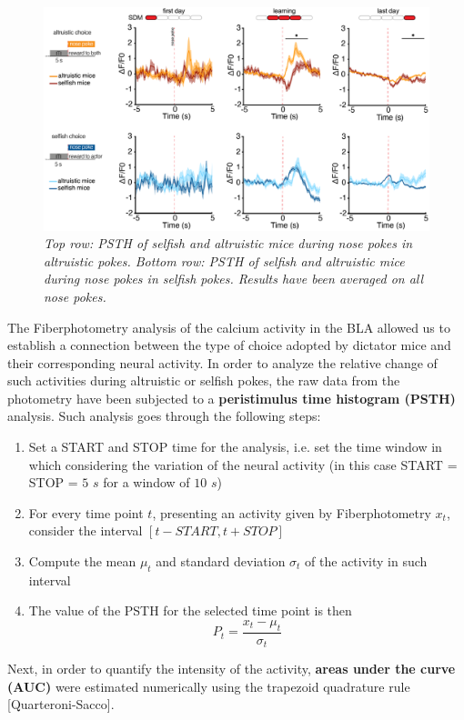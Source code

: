 \documentclass[12pt, a4paper]{report}
\begin{document}
\begin{figure}[H]
	\begin{center}
		\includegraphics[scale=0.55]{psth.png} 
	\end{center} 
	\caption{\textit{Top row: PSTH of selfish and altruistic mice during nose pokes in altruistic pokes. Bottom row:  PSTH of selfish and altruistic mice during nose pokes in selfish pokes. Results have been averaged on all nose pokes.}}
	\label{psth}
\end{figure}

The Fiberphotometry analysis of the calcium activity in the BLA allowed us to establish a connection between the type of choice adopted by dictator mice and their corresponding neural activity. In order to analyze the relative change of such activities during altruistic or selfish pokes, the raw data from the photometry have been subjected to a \textbf{peristimulus time histogram (PSTH)} analysis. Such analysis goes through the following steps:

\begin{enumerate}
	
	\item Set a START and STOP time for the analysis, i.e. set the time window in which considering the variation of the neural activity (in this case START = STOP = $5$ $s$ for a window of $10$ $s$)
	
	\item For every time point $t$, presenting an activity given by Fiberphotometry $x_t$, consider the interval $[t-START , t+STOP]$
	
	\item Compute the mean $ \mu_t$ and standard deviation $\sigma_t$ of the activity in such interval
	
	\item The value of the PSTH for the selected time point is then
	$$ P_t = \frac{x_t - \mu_t}{\sigma_t}$$
\end{enumerate}
Next, in order to quantify the intensity of the activity, \textbf{areas under the curve (AUC)} were estimated numerically using the trapezoid quadrature rule [Quarteroni-Sacco].\\
\end{document}
